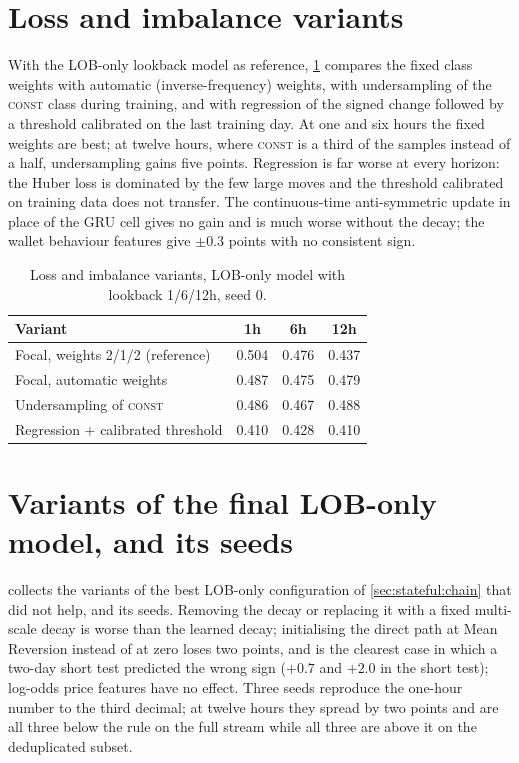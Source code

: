 \section{Loss and imbalance variants}
\label{app:results:loss}
\label{sec:stateful:variants}

With the LOB-only lookback model as reference, \cref{tab:exp:variants} compares the fixed
class weights with automatic (inverse-frequency) weights, with undersampling of the
\textsc{const} class during training, and with regression of the signed change followed by
a threshold calibrated on the last training day.  At one and six hours the fixed weights are
best; at twelve hours, where \textsc{const} is a third of the samples instead of a half,
undersampling gains five points.  Regression is far worse at every horizon: the Huber loss
is dominated by the few large moves and the threshold calibrated on training data does not
transfer.  The continuous-time anti-symmetric update \cite{gravina2024ctan} in place of the
GRU cell gives no gain and is much worse without the decay; the wallet behaviour features
give $\pm 0.3$ points with no consistent sign.

\begin{table}[t]
\centering
\caption{Loss and imbalance variants, LOB-only model with lookback 1/6/12h, seed 0.}
\label{tab:exp:variants}
\begin{fittable}\begin{tabular}{lccc}
\toprule
Variant & 1h & 6h & 12h \\
\midrule
Focal, weights 2/1/2 (reference) & 0.504 & 0.476 & 0.437 \\
Focal, automatic weights          & 0.487 & 0.475 & 0.479 \\
Undersampling of \textsc{const}   & 0.486 & 0.467 & 0.488 \\
Regression + calibrated threshold & 0.410 & 0.428 & 0.410 \\
\bottomrule
\end{tabular}\end{fittable}
\end{table}

\section{Variants of the final LOB-only model, and its seeds}
\label{app:results:variants}

 collects the variants of the best LOB-only configuration of
\cref{sec:stateful:chain} that did not help, and its seeds.  Removing the decay or
replacing it with a fixed multi-scale decay is worse than the learned decay; initialising
the direct path at Mean Reversion instead of at zero loses two points, and is the clearest
case in which a two-day short test predicted the wrong sign ($+0.7$ and $+2.0$ in the short
test); log-odds price features have no effect.  Three seeds reproduce the one-hour number to
the third decimal; at twelve hours they spread by two points and are all three below the
rule on the full stream while all three are above it on the deduplicated subset.

